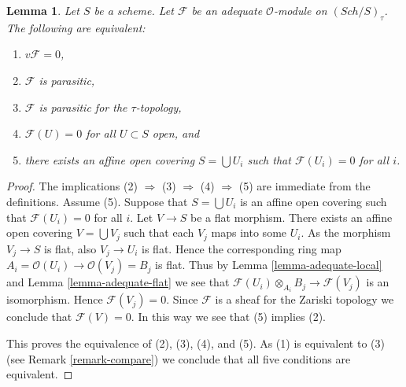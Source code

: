\documentclass{stacks-project}
\theoremstyle{plain}
\newtheorem{lemma}[subsection]{Lemma}
\theoremstyle{definition}
\theoremstyle{remark}
\numberwithin{equation}{subsection}
\def\Sch{\mathit{Sch}}
\begin{document}
\begin{lemma}
\label{lemma-parasitic-adequate}
Let $S$ be a scheme.
Let $\mathcal{F}$ be an adequate $\mathcal{O}$-module on
$(\Sch/S)_\tau$. The following are equivalent:
\begin{enumerate}
\item $v\mathcal{F} = 0$,
\item $\mathcal{F}$ is parasitic,
\item $\mathcal{F}$ is parasitic for the $\tau$-topology,
\item $\mathcal{F}(U) = 0$ for all $U \subset S$ open, and
\item there exists an affine open covering $S = \bigcup U_i$
such that $\mathcal{F}(U_i) = 0$ for all $i$.
\end{enumerate}
\end{lemma}

\begin{proof}
The implications (2) $\Rightarrow$ (3) $\Rightarrow$ (4) $\Rightarrow$ (5)
are immediate from the definitions. Assume (5). Suppose that
$S = \bigcup U_i$ is an affine open covering such that $\mathcal{F}(U_i) = 0$
for all $i$. Let $V \to S$ be a flat morphism. There exists an affine
open covering $V = \bigcup V_j$ such that each $V_j$ maps into some
$U_i$. As the morphism $V_j \to S$ is flat, also $V_j \to U_i$ is flat. 
Hence the corresponding ring map
$A_i = \mathcal{O}(U_i) \to \mathcal{O}(V_j) = B_j$ is flat. Thus by
Lemma \ref{lemma-adequate-local}
and
Lemma \ref{lemma-adequate-flat}
we see that $\mathcal{F}(U_i) \otimes_{A_i} B_j \to \mathcal{F}(V_j)$
is an isomorphism. Hence $\mathcal{F}(V_j) = 0$. Since $\mathcal{F}$ is
a sheaf for the Zariski topology we conclude that $\mathcal{F}(V) = 0$.
In this way we see that (5) implies (2).

\medskip\noindent
This proves the equivalence of (2), (3), (4), and (5).
As (1) is equivalent to (3) (see
Remark \ref{remark-compare})
we conclude that all five conditions are equivalent.
\end{proof}
\end{document}
